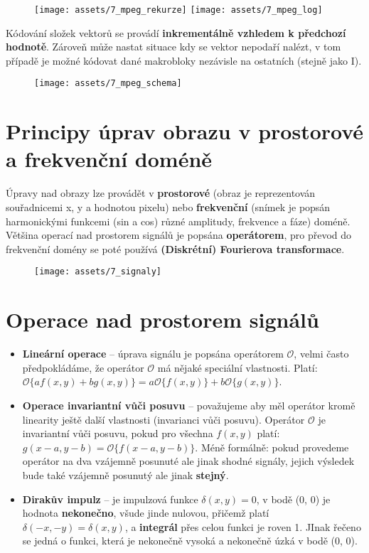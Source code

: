 \begin{figure}[H]
    \centering
    \texttt{[image: assets/7\_mpeg\_rekurze]}
    \texttt{[image: assets/7\_mpeg\_log]}
\end{figure}

Kódování složek vektorů se provádí \textbf{inkrementálně vzhledem k předchozí hodnotě}. Zároveň může nastat situace kdy se vektor nepodaří nalézt, v tom případě je možné kódovat dané makrobloky nezávisle na ostatních (stejně jako I).

\begin{figure}[H]
    \centering
    \texttt{[image: assets/7\_mpeg\_schema]}
\end{figure}

\section{Principy úprav obrazu v prostorové a frekvenční doméně}
Úpravy nad obrazy lze provádět v \textbf{prostorové} (obraz je reprezentován souřadnicemi x, y a hodnotou pixelu) nebo \textbf{frekvenční} (snímek je popsán harmonickými funkcemi (sin a cos) různé amplitudy, frekvence a fáze) doméně. Většina operací nad prostorem signálů je popsána \textbf{operátorem}, pro převod do frekvenční domény se poté používá \textbf{(Diskrétní) Fourierova transformace}.

\begin{figure}[H]
    \centering
    \texttt{[image: assets/7\_signaly]}
\end{figure}

\section{Operace nad prostorem signálů}
\begin{itemize}
    \item \textbf{Lineární operace} -- úprava signálu je popsána operátorem $\mathcal{O}$, velmi často předpokládáme, že operátor $\mathcal{O}$ má nějaké speciální vlastnosti. Platí: $\mathcal{O}\{af(x, y) + bg(x, y)\} = a\mathcal{O}\{f(x, y)\} + b\mathcal{O}\{g(x, y)\}$.
    \item \textbf{Operace invariantní vůči posuvu} -- považujeme aby měl operátor kromě linearity ještě další vlastnosti (invarianci vůči posuvu). Operátor $\mathcal{O}$ je invariantní vůči posuvu, pokud pro všechna $f(x, y)$ platí: $g(x - a, y -b) = \mathcal{O}\{f(x-a, y-b)\}$. Méně formálně: pokud provedeme operátor na dva vzájemně posunuté ale jinak shodné signály, jejich výsledek bude také vzájemně posunutý ale jinak \textbf{stejný}.
    \item \textbf{Dirakův impulz} -- je impulzová funkce $\delta(x, y) = 0$, v bodě (0, 0) je hodnota \textbf{nekonečno}, všude jinde nulovou, přičemž platí $\delta(-x, -y) = \delta(x, y)$, a \textbf{integrál} přes celou funkci je roven 1. JInak řečeno se jedná o funkci, která je nekonečně vysoká a nekonečně úzká v bodě (0, 0).
\end{itemize}

